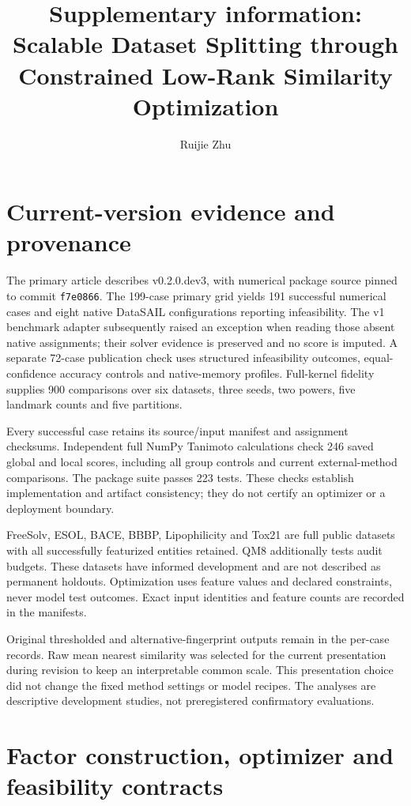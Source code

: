 \documentclass[12pt]{article}
\title{Supplementary information: Scalable Dataset Splitting through Constrained Low-Rank Similarity Optimization}
\author{Ruijie Zhu}
\date{}
\begin{document}
\maketitle

\section{Current-version evidence and provenance}

The primary article describes v0.2.0.dev3, with numerical package source pinned
to commit \texttt{f7e0866}. The 199-case primary grid yields 191 successful
numerical cases and eight native DataSAIL configurations reporting infeasibility.
The v1 benchmark adapter subsequently raised an exception when reading those
absent native assignments; their solver evidence is preserved and no score is
imputed. A separate 72-case publication check uses structured infeasibility
outcomes, equal-confidence accuracy controls and native-memory profiles.
Full-kernel fidelity supplies 900 comparisons over six datasets, three seeds,
two powers, five landmark counts and five partitions.

Every successful case retains its source/input manifest and assignment checksums.
Independent full NumPy Tanimoto calculations check 246 saved global and local
scores, including all group controls and current external-method comparisons.
The package suite passes 223 tests. These checks establish implementation and
artifact consistency; they do not certify an optimizer or a deployment boundary.

FreeSolv, ESOL, BACE, BBBP, Lipophilicity and Tox21 are full public datasets with
all successfully featurized entities retained. QM8 additionally tests audit
budgets. These datasets have informed development and are not described as
permanent holdouts. Optimization uses feature values and declared constraints,
never model test outcomes. Exact input identities and feature counts are
recorded in the manifests.

Original thresholded and alternative-fingerprint outputs remain in the
per-case records. Raw mean nearest similarity was selected for the current
presentation during revision to keep an interpretable common scale.
This presentation choice did not change the fixed method settings or model
recipes. The analyses are descriptive development studies, not preregistered
confirmatory evaluations.

\section{Factor construction, optimizer and feasibility contracts}
\end{document}
